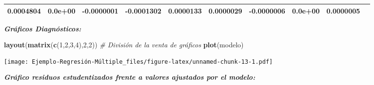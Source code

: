 \documentclass[]{article}
\newenvironment{Shaded}{\begin{snugshade}}{\end{snugshade}}
\newcommand{\KeywordTok}[1]{\textcolor[rgb]{0.13,0.29,0.53}{\textbf{#1}}}
\newcommand{\DecValTok}[1]{\textcolor[rgb]{0.00,0.00,0.81}{#1}}
\newcommand{\CommentTok}[1]{\textcolor[rgb]{0.56,0.35,0.01}{\textit{#1}}}
\newcommand{\NormalTok}[1]{#1}
\begin{document}
\begin{longtable}[]{@{}lrrrrrrrrr@{}}
\begin{minipage}[t]{0.07\columnwidth}
0.0004804\strut
\end{minipage} & \begin{minipage}[t]{0.07\columnwidth}\raggedleft\strut
0.0e+00\strut
\end{minipage} & \begin{minipage}[t]{0.07\columnwidth}\raggedleft\strut
-0.0000001\strut
\end{minipage} & \begin{minipage}[t]{0.09\columnwidth}\raggedleft\strut
-0.0001302\strut
\end{minipage} & \begin{minipage}[t]{0.07\columnwidth}\raggedleft\strut
0.0000133\strut
\end{minipage} & \begin{minipage}[t]{0.07\columnwidth}\raggedleft\strut
0.0000029\strut
\end{minipage} & \begin{minipage}[t]{0.07\columnwidth}\raggedleft\strut
-0.0000006\strut
\end{minipage} & \begin{minipage}[t]{0.06\columnwidth}\raggedleft\strut
0.0e+00\strut
\end{minipage} & \begin{minipage}[t]{0.09\columnwidth}\raggedleft\strut
0.0000005\strut
\end{minipage}\tabularnewline
\bottomrule
\end{longtable}

\emph{\textbf{Gráficos Diagnósticos:}}

\begin{Shaded}
\begin{Highlighting}[]
\KeywordTok{layout}\NormalTok{(}\KeywordTok{matrix}\NormalTok{(}\KeywordTok{c}\NormalTok{(}\DecValTok{1}\NormalTok{,}\DecValTok{2}\NormalTok{,}\DecValTok{3}\NormalTok{,}\DecValTok{4}\NormalTok{),}\DecValTok{2}\NormalTok{,}\DecValTok{2}\NormalTok{)) }\CommentTok{# División de la venta de gráficos}
\KeywordTok{plot}\NormalTok{(modelo)}
\end{Highlighting}
\end{Shaded}

\texttt{[image: Ejemplo-Regresión-Múltiple\_files/figure-latex/unnamed-chunk-13-1.pdf]}

\emph{\textbf{Gráfico residuos estudentizados frente a valores ajustados
por el modelo:}}
\end{document}
